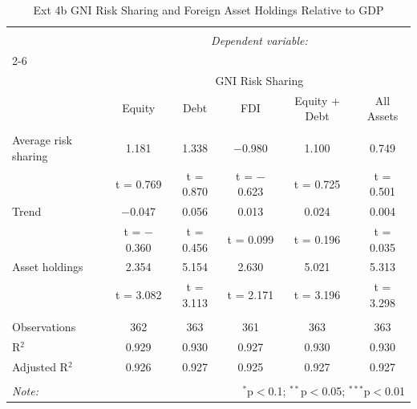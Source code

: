 
\begin{table}[!htbp] \centering 
  \caption{Ext 4b GNI Risk Sharing and Foreign Asset Holdings Relative to GDP} 
  \label{} 
\begin{tabular}{@{\extracolsep{5pt}}lccccc} 
\\[-1.8ex]\hline 
\hline \\[-1.8ex] 
 & \multicolumn{5}{c}{\textit{Dependent variable:}} \\ 
\cline{2-6} 
\\[-1.8ex] & \multicolumn{5}{c}{GNI Risk Sharing} \\ 
 & Equity & Debt & FDI & Equity + Debt & All Assets \\ 
\hline \\[-1.8ex] 
 Average risk sharing & 1.181 & 1.338 & $-$0.980 & 1.100 & 0.749 \\ 
  & t = 0.769 & t = 0.870 & t = $-$0.623 & t = 0.725 & t = 0.501 \\ 
  Trend & $-$0.047 & 0.056 & 0.013 & 0.024 & 0.004 \\ 
  & t = $-$0.360 & t = 0.456 & t = 0.099 & t = 0.196 & t = 0.035 \\ 
  Asset holdings & 2.354 & 5.154 & 2.630 & 5.021 & 5.313 \\ 
  & t = 3.082 & t = 3.113 & t = 2.171 & t = 3.196 & t = 3.298 \\ 
 \hline \\[-1.8ex] 
Observations & 362 & 363 & 361 & 363 & 363 \\ 
R$^{2}$ & 0.929 & 0.930 & 0.927 & 0.930 & 0.930 \\ 
Adjusted R$^{2}$ & 0.926 & 0.927 & 0.925 & 0.927 & 0.927 \\ 
\hline 
\hline \\[-1.8ex] 
\textit{Note:}  & \multicolumn{5}{r}{$^{*}$p$<$0.1; $^{**}$p$<$0.05; $^{***}$p$<$0.01} \\ 
\end{tabular} 
\end{table} 
